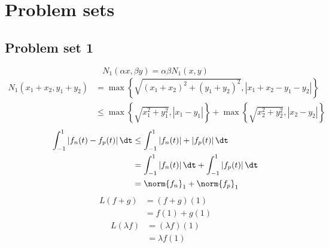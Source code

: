 \newpage
\section{Problem sets}
\subsection{Problem set 1}
\begin{equation*}
	N_{1}(\alpha x,\beta y)=\alpha\beta N_{1}(x,y)
\end{equation*}
\begin{align*}
	N_{1}(x_{1}+x_{2},y_{1}+y_{2})&=\max\left\{\sqrt{(x_{1}+x_{2})^{2}+(y_{1}+y_{2})^{2}},\left|x_{1}+x_{2}-y_{1}-y_{2}\right|\right\}\\
	&\leq\max\left\{\sqrt{x_{1}^{2}+y_{1}^{2}},|x_{1}-y_{1}|\right\}+\max\left\{\sqrt{x_{2}^{2}+y_{2}^{2}},|x_{2}-y_{2}|\right\}
\end{align*}
\begin{align*}
	\int_{-1}^{1}\left|f_{n}(t)-f_{p}(t)\right|\dt&\leq\int_{-1}^{1}\left|f_{n}(t)\right|+\left|f_{p}(t)\right|\dt\\
	&=\int_{-1}^{1}\left|f_{n}(t)\right|\dt+\int_{-1}^{1}\left|f_{p}(t)\right|\dt\\
	&=\norm{f_{n}}_{1}+\norm{f_{p}}_{1}
\end{align*}
\begin{align*}
	L(f+g)&=(f+g)(1)\\
	&=f(1)+g(1)
\end{align*}
\begin{align*}
	L(\lambda f)&=(\lambda f)(1)\\
	&=\lambda f(1)
\end{align*}
